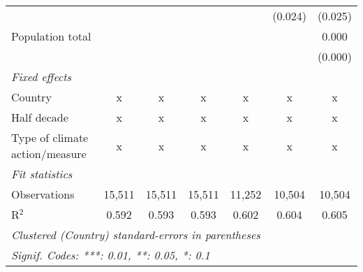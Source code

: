 \begin{tabular}{lcccccc}
                                                                             &         &                &                &                & (0.024)        & (0.025)\\   
   Population total                                                          &         &                &                &                &                & 0.000\\   
                                                                             &         &                &                &                &                & (0.000)\\   
   \emph{Fixed effects}\\
   Country                                                                   & x       & x              & x              & x              & x              & x\\  
   Half decade                                                               & x       & x              & x              & x              & x              & x\\  
   Type of climate action/measure                                            & x       & x              & x              & x              & x              & x\\  
   \midrule \emph{Fit statistics}\\
   Observations                                                              & 15,511  & 15,511         & 15,511         & 11,252         & 10,504         & 10,504\\  
   R$^2$                                                                     & 0.592   & 0.593          & 0.593          & 0.602          & 0.604          & 0.605\\  
   \midrule
   \multicolumn{7}{l}{\emph{Clustered (Country) standard-errors in parentheses}}\\
   \multicolumn{7}{l}{\emph{Signif. Codes: ***: 0.01, **: 0.05, *: 0.1}}\\
\end{tabular}
\par\endgroup


